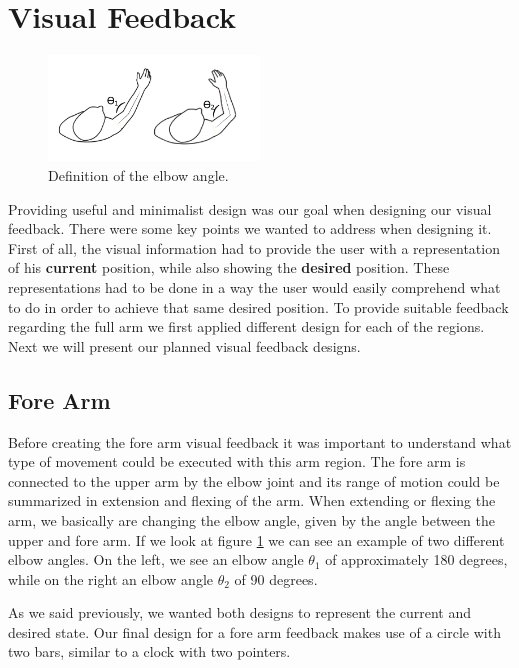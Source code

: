 \section{Visual Feedback}

\begin{figure}[!t]
    \begin{center}
        \includegraphics[width=0.5\textwidth]{imgs/elbowangle.png}
    \end{center}
    \caption{Definition of the elbow angle.}
    \label{fig:elbowangle}
\end{figure}

Providing useful and minimalist design was our goal when designing our visual feedback. There were some key points we wanted to address when designing it.
First of all, the visual information had to provide the user with a representation of his \textbf{current} position, while also showing the \textbf{desired} position. 
These representations had to be done in a way the user would easily comprehend what to do in order to achieve that same desired position.
To provide suitable feedback regarding the full arm we first applied different design for each of the regions. Next we will present our planned visual feedback designs.

\subsection{Fore Arm}

Before creating the fore arm visual feedback it was important to understand what type of movement could be executed with this arm region.
The fore arm is connected to the upper arm by the elbow joint and its range of motion could be summarized in extension and flexing of the arm.
When extending or flexing the arm, we basically are changing the elbow angle, given by the angle between the upper and fore arm.
If we look at figure \ref{fig:elbowangle} we can see an example of two different elbow angles. On the left, we see an elbow angle $\theta$$_1$ of approximately 180 degrees, while on the right an elbow angle $\theta$$_2$ of 90 degrees.  

As we said previously, we wanted both designs to represent the current and desired state. Our final design for a fore arm feedback makes use of a circle with two bars, similar to a clock with two pointers.

